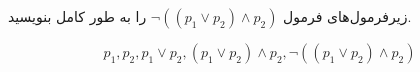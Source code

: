 زیرفرمول‌های فرمول
$\neg((p_1\vee p_2)\wedge p_2)$
را به طور کامل بنویسید.
\begin{ans}
$$
p_1,p_2,p_1\vee p_2,(p_1\vee p_2)\wedge p_2,\neg((p_1\vee p_2)\wedge p_2)
$$
\end{ans}